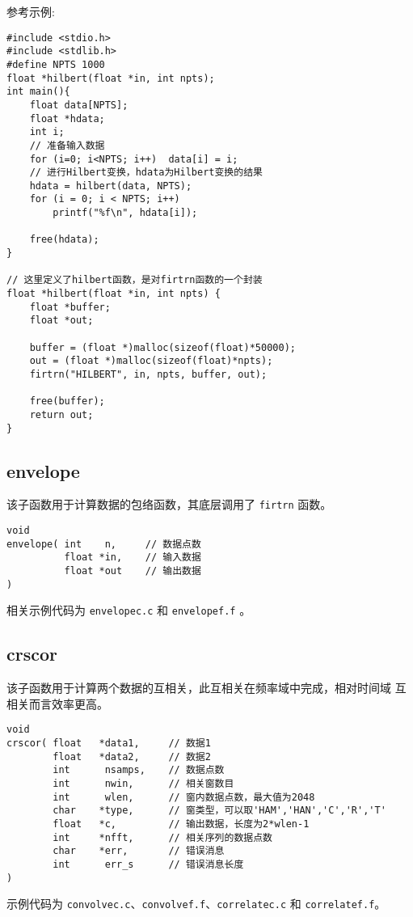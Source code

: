 参考示例:
\begin{verbatim}
#include <stdio.h>
#include <stdlib.h>
#define NPTS 1000
float *hilbert(float *in, int npts);
int main(){
    float data[NPTS];
    float *hdata;
    int i;
    // 准备输入数据
    for (i=0; i<NPTS; i++)  data[i] = i;
    // 进行Hilbert变换，hdata为Hilbert变换的结果
    hdata = hilbert(data, NPTS);
    for (i = 0; i < NPTS; i++)
        printf("%f\n", hdata[i]);

    free(hdata);
}

// 这里定义了hilbert函数，是对firtrn函数的一个封装
float *hilbert(float *in, int npts) {
    float *buffer;
    float *out;

    buffer = (float *)malloc(sizeof(float)*50000);
    out = (float *)malloc(sizeof(float)*npts);
    firtrn("HILBERT", in, npts, buffer, out);

    free(buffer);
    return out;
}
\end{verbatim}

\subsection{envelope}
该子函数用于计算数据的包络函数，其底层调用了 \texttt{firtrn} 函数。
\begin{verbatim}
void
envelope( int    n,     // 数据点数
          float *in,    // 输入数据
          float *out    // 输出数据
)
\end{verbatim}

相关示例代码为 \texttt{envelopec.c} 和 \texttt{envelopef.f} 。

\subsection{crscor}
该子函数用于计算两个数据的互相关，此互相关在频率域中完成，相对时间域
互相关而言效率更高。

\begin{verbatim}
void
crscor( float   *data1,     // 数据1
        float   *data2,     // 数据2
        int      nsamps,    // 数据点数
        int      nwin,      // 相关窗数目
        int      wlen,      // 窗内数据点数，最大值为2048
        char    *type,      // 窗类型，可以取'HAM','HAN','C','R','T'
        float   *c,         // 输出数据，长度为2*wlen-1
        int     *nfft,      // 相关序列的数据点数
        char    *err,       // 错误消息
        int      err_s      // 错误消息长度
)
\end{verbatim}

示例代码为 \texttt{convolvec.c}、\texttt{convolvef.f}、\texttt{correlatec.c}
和 \texttt{correlatef.f}。
